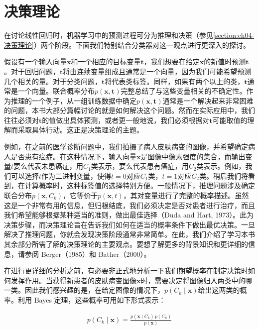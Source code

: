 \documentclass[../../main.tex]{subfiles}
\begin{document}
\section{决策理论}\label{section:ch05-决策理论}

在讨论线性回归时，机器学习中的预测过程可分为推理和决策（参见\cref{section:ch04-决策理论}）两个阶段。下面我们特别结合分类器对这一观点进行更深入的探讨。

假设有一个输入向量$\boldsymbol{x}$和一个相应的目标变量$\boldsymbol{t}$，我们想要在给定$\boldsymbol{x}$的新值时预测$\boldsymbol{t}$。对于回归问题，$\boldsymbol{t}$将由连续变量组成且通常是一个向量，因为我们可能希望预测几个相关的量。对于分类问题，$\boldsymbol{t}$将代表类标签。同样，如果有两个以上的类，$\boldsymbol{t}$通常是一个向量。联合概率分布$p(\boldsymbol{x},\boldsymbol{t})$完整总结了与这些变量相关的不确定性。作为推理的一个例子，从一组训练数据中确定$p(\boldsymbol{x},\boldsymbol{t})$通常是一个解决起来非常困难的问题，本书大部分篇幅讨论的就是如何解决这个问题。然而在实际应用中，我们往往必须对$\boldsymbol{t}$的值做出具体预测，或者更一般地说，我们必须根据对$\boldsymbol{t}$可能取值的理解而采取具体行动。这正是决策理论的主题。

例如，在之前的医学诊断问题中，我们拍摄了病人皮肤病变的图像，并希望确定病人是否患有癌症。在这种情况下，输入向量$\boldsymbol{x}$是图像中像素强度的集合，而输出变量$t$要么代表未患癌症，用$C_1$类表示，要么代表患有癌症，用$C_2$类表示。例如，我们可以选择$t$作为二进制变量，使得$t=0$对应$C_1$类，$t=1$对应$C_2$类。稍后我们将看到，在计算概率时，这种标签值的选择特别方便。一般情况下，推理问题涉及确定联合分布$p(\boldsymbol{x},C_k)$，它等价于$p(\boldsymbol{x},t)$，其对变量进行了完整的概率描述。虽然这是一个非常有用的信息，但归根结底，我们必须决定是否对患者进行治疗，而且我们希望能够根据某种适当的准则，做出最佳选择（Duda and Hart, 1973）。此为决策步骤，而决策理论旨在告诉我们如何在适当的概率条件下做出最优决策。一旦解决了推理问题，你就会发现决策阶段通常非常简单。在此，我们介绍了学习本书其余部分所需了解的决策理论的主要观点。要想了解更多的背景知识和更详细的信息，请参阅 Berger（1985）和 Bather（2000）。

在进行更详细的分析之前，有必要非正式地分析一下我们期望概率在制定决策时如何发挥作用。当获得新患者的皮肤病变图像$\boldsymbol{x}$时，需要决定将图像归入两类中的哪一类。因此我们感兴趣的是，在给定图像的情况下，$p(C_k\mid\boldsymbol{x})$给出这两类的概率。利用 Bayes 定理，这些概率可用如下形式表示：

\begin{align}
  p(C_k\mid\boldsymbol{x})=\frac{p(\boldsymbol{x}\mid C_k)\,p(C_k)}{p(\boldsymbol{x})}
  \label{align:ch05-决策后验}
\end{align}
\end{document}
